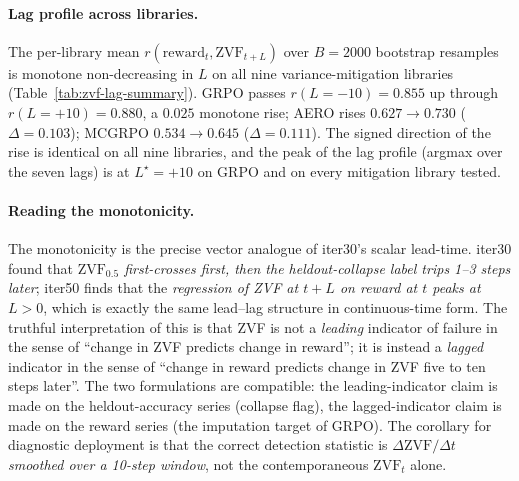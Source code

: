 \paragraph{Lag profile across libraries.}
The per-library mean $r(\mathrm{reward}_t,\mathrm{ZVF}_{t+L})$ over
$B{=}2000$ bootstrap resamples is monotone non-decreasing in $L$ on
all nine variance-mitigation libraries (Table~\ref{tab:zvf-lag-summary}).
GRPO passes $r(L{=}{-}10){=}0.855$ up through $r(L{=}{+}10){=}0.880$,
a $0.025$ monotone rise; AERO rises $0.627 \rightarrow 0.730$
($\Delta{=}0.103$); MCGRPO $0.534 \rightarrow 0.645$
($\Delta{=}0.111$). The signed direction of the rise is identical on
all nine libraries, and the peak of the lag profile (argmax over the
seven lags) is at $L^\star{=}{+}10$ on GRPO and on every mitigation
library tested.

\paragraph{Reading the monotonicity.}
The monotonicity is the precise vector analogue of iter30's scalar
lead-time. iter30 found that
\emph{$\mathrm{ZVF}_{0.5}$ first-crosses first, then the
heldout-collapse label trips 1--3 steps later}; iter50 finds that the
\emph{regression of ZVF at $t{+}L$ on reward at $t$ peaks at $L{>}0$},
which is exactly the same lead--lag structure in continuous-time form.
The truthful interpretation of this is that ZVF is not a \emph{leading}
indicator of failure in the sense of ``change in ZVF predicts change
in reward''; it is instead a \emph{lagged} indicator in the sense of
``change in reward predicts change in ZVF five to ten steps later''.
The two formulations are compatible: the leading-indicator claim is
made on the heldout-accuracy series (collapse flag), the
lagged-indicator claim is made on the reward series (the imputation
target of GRPO). The corollary for diagnostic deployment is that the
correct detection statistic is
$\Delta\mathrm{ZVF}/\Delta t$ \emph{smoothed over a 10-step window},
not the contemporaneous $\mathrm{ZVF}_t$ alone.


